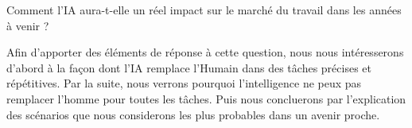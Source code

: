 Comment l'IA aura-t-elle un réel impact sur le marché du travail dans les années à venir ?

Afin d'apporter des éléments de réponse à cette question, nous nous intéresserons d'abord à la façon dont l'IA remplace 
l'Humain dans des tâches précises et répétitives.
Par la suite, nous verrons pourquoi l'intelligence ne peux pas remplacer l'homme pour toutes les tâches.
Puis nous concluerons par l'explication des scénarios que nous considerons les plus probables dans un avenir proche.
